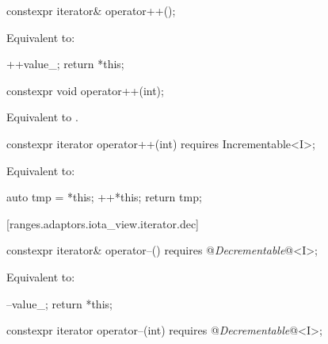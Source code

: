 \begin{itemdecl}
constexpr iterator& operator++();
\end{itemdecl}

\begin{itemdescr}
\pnum
\effects Equivalent to:
\begin{codeblock}
++value_;
return *this;
\end{codeblock}
\end{itemdescr}

\begin{itemdecl}
constexpr void operator++(int);
\end{itemdecl}

\begin{itemdescr}
\pnum
\effects Equivalent to .
\end{itemdescr}

\begin{itemdecl}
constexpr iterator operator++(int) requires Incrementable<I>;
\end{itemdecl}

\begin{itemdescr}
\pnum
\effects Equivalent to:
\begin{codeblock}
auto tmp = *this;
++*this;
return tmp;
\end{codeblock}
\end{itemdescr}

[ranges.adaptors.iota_view.iterator.dec]{}

\begin{itemdecl}
constexpr iterator& operator--() requires @\textit{Decrementable}@<I>;
\end{itemdecl}

\begin{itemdescr}
\pnum
\effects Equivalent to:
\begin{codeblock}
--value_;
return *this;
\end{codeblock}
\end{itemdescr}

\begin{itemdecl}
constexpr iterator operator--(int) requires @\textit{Decrementable}@<I>;
\end{itemdecl}

